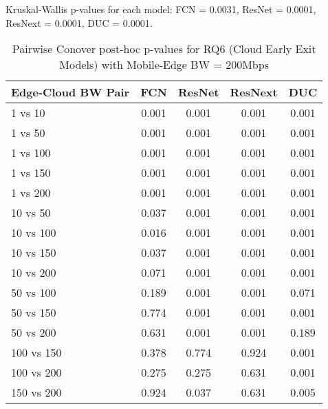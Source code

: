 \begin{table}[h]
\centering
\caption{Pairwise Conover post-hoc p-values for RQ6 (Cloud Early Exit Models) with Mobile-Edge BW = 200Mbps}
\label{tab:conover_cloud_earlyexit_me200}
\smallskip
Kruskal-Wallis p-values for each model: FCN = 0.0031, ResNet = 0.0001, ResNext = 0.0001, DUC = 0.0001.

\begin{tabular}{lcccc}
\toprule
Edge-Cloud BW Pair & FCN & ResNet & ResNext & DUC \\
\midrule
1 vs 10 & 0.001 & 0.001 & 0.001 & 0.001 \\
1 vs 50 & 0.001 & 0.001 & 0.001 & 0.001 \\
1 vs 100 & 0.001 & 0.001 & 0.001 & 0.001 \\
1 vs 150 & 0.001 & 0.001 & 0.001 & 0.001 \\
1 vs 200 & 0.001 & 0.001 & 0.001 & 0.001 \\
10 vs 50 & 0.037 & 0.001 & 0.001 & 0.001 \\
10 vs 100 & 0.016 & 0.001 & 0.001 & 0.001 \\
10 vs 150 & 0.037 & 0.001 & 0.001 & 0.001 \\
10 vs 200 & 0.071 & 0.001 & 0.001 & 0.001 \\
50 vs 100 & 0.189 & 0.001 & 0.001 & 0.071 \\
50 vs 150 & 0.774 & 0.001 & 0.001 & 0.001 \\
50 vs 200 & 0.631 & 0.001 & 0.001 & 0.189 \\
100 vs 150 & 0.378 & 0.774 & 0.924 & 0.001 \\
100 vs 200 & 0.275 & 0.275 & 0.631 & 0.001 \\
150 vs 200 & 0.924 & 0.037 & 0.631 & 0.005 \\
\bottomrule
\end{tabular}
\end{table}

